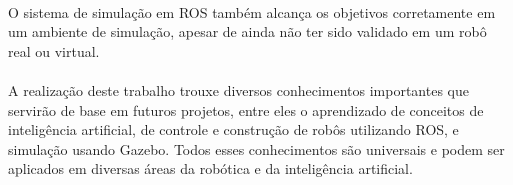\documentclass[12pt,titlepage]{article}
\begin{document}
	\paragraph{}
	O sistema de simulação em ROS também alcança os objetivos corretamente em um ambiente de simulação, apesar de ainda não ter sido validado em um robô real ou virtual.
	\paragraph{}
	A realização deste trabalho trouxe diversos conhecimentos importantes que servirão de base em futuros projetos, entre eles o aprendizado de conceitos de inteligência artificial, de controle e construção de robôs utilizando ROS, e simulação usando Gazebo. Todos esses conhecimentos são universais e podem ser aplicados em diversas áreas da robótica e da inteligência artificial.




\newpage

\nocite{}


\end{document}

